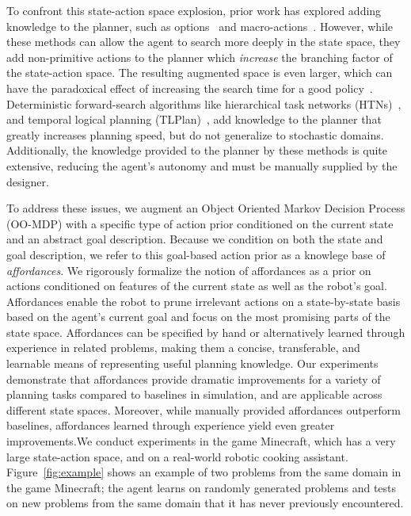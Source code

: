 To confront this state-action space explosion, prior work has explored
adding knowledge to the planner, such as options~\cite{sutton99} and
macro-actions~\cite{Botea:2005kx,Newton:2005vn}.  However, while these
methods can allow the agent to search more deeply in the state space,
they add non-primitive actions to the planner which {\em increase} the
branching factor of the state-action space.  The resulting augmented
space is even larger, which can have the paradoxical effect of
increasing the search time for a good policy~\cite{Jong:2008zr}.
Deterministic forward-search algorithms like hierarchical task
networks (HTNs)~\citep{Nau:1999:SSH:1624312.1624357}, and temporal
logical planning
(TLPlan)~\citep{Bacchus95usingtemporal,Bacchus99usingtemporal}, add
knowledge to the planner that greatly increases planning speed, but do
not generalize to stochastic domains. Additionally, the knowledge
provided to the planner by these methods is quite extensive, reducing
the agent's autonomy and must be manually supplied by the designer.

To address these issues, we augment an Object Oriented Markov Decision
Process (OO-MDP) with a specific type of action prior conditioned on
the current state and an abstract goal description.  Because we
condition on both the state and goal description, we refer to this
goal-based action prior as a knowlege base of {\em affordances}.  We
rigorously formalize the notion of affordances as a prior on actions
conditioned on features of the current state as well as the robot's
goal.  Affordances enable the robot to prune irrelevant actions on a
state-by-state basis based on the agent's current goal and focus on
the most promising parts of the state space.  Affordances can be
specified by hand or alternatively learned through experience in
related problems, making them a concise, transferable, and learnable
means of representing useful planning knowledge. Our experiments
demonstrate that affordances provide dramatic improvements for a
variety of planning tasks compared to baselines in simulation, and are
applicable across different state spaces.  Moreover, while manually
provided affordances outperform baselines, affordances learned through
experience yield even greater improvements.We conduct experiments in
the game Minecraft, which has a very large state-action space, and on
a real-world robotic cooking assistant.  Figure~\ref{fig:example}
shows an example of two problems from the same domain in the game
Minecraft; the agent learns on randomly generated problems and tests
on new problems from the same domain that it has never previously
encountered.


